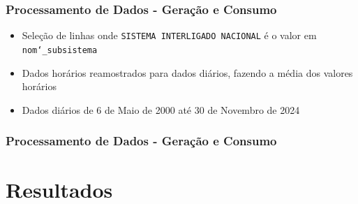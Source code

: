 \documentclass{beamer}
\begin{document}
\begin{frame}
\frametitle{Processamento de Dados - Geração e Consumo}
\begin{itemize}
    \item Seleção de linhas onde \texttt{SISTEMA INTERLIGADO NACIONAL} é o valor em \texttt{nom\char`_subsistema}
    \item Dados horários reamostrados para dados diários, fazendo a média dos valores horários
    \item Dados diários de 6 de Maio de 2000 até 30 de Novembro de 2024
\end{itemize}
\end{frame}


\begin{frame}
\frametitle{Processamento de Dados - Geração e Consumo}
\begin{table}[ht]
    \centering
    \caption{Amostra dos Dados de Geração e Consumo}
\end{table}
\end{frame}


\section{Resultados}
\end{document}
